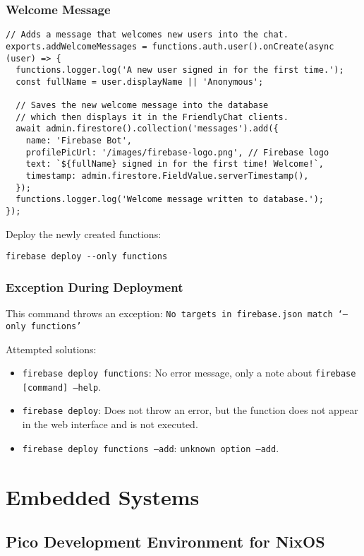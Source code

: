 \subsubsection{Welcome Message}
\begin{verbatim}
// Adds a message that welcomes new users into the chat.
exports.addWelcomeMessages = functions.auth.user().onCreate(async (user) => {
  functions.logger.log('A new user signed in for the first time.');
  const fullName = user.displayName || 'Anonymous';

  // Saves the new welcome message into the database
  // which then displays it in the FriendlyChat clients.
  await admin.firestore().collection('messages').add({
    name: 'Firebase Bot',
    profilePicUrl: '/images/firebase-logo.png', // Firebase logo
    text: `${fullName} signed in for the first time! Welcome!`,
    timestamp: admin.firestore.FieldValue.serverTimestamp(),
  });
  functions.logger.log('Welcome message written to database.');
});
\end{verbatim}

Deploy the newly created functions:
\begin{verbatim}
firebase deploy --only functions
\end{verbatim}

\subsubsection{Exception During Deployment}
This command throws an exception: 
\texttt{No targets in firebase.json match ‘--only functions’}

Attempted solutions:
\begin{itemize}
    \item \texttt{firebase deploy functions}: No error message, only a note about \texttt{firebase [command] --help}.
    \item \texttt{firebase deploy}: Does not throw an error, but the function does not appear in the web interface and is not executed.
    \item \texttt{firebase deploy functions --add}: \texttt{unknown option --add}.
\end{itemize}

\section{Embedded Systems}

\subsection{Pico Development Environment for NixOS}

